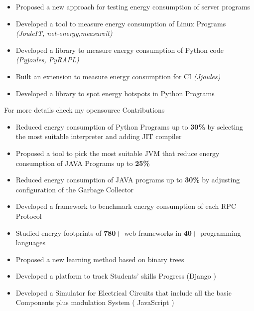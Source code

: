 \documentclass[10pt,a4paper,ragged2e,withhyper]{altacv}
\begin{document}
\begin{paracol}{2}
  \medskip

  \begin{itemize}
    \item Proposed a new approach for testing energy consumption of server programs
    \item Developed a tool to measure energy consumption of Linux Programs \emph{(JouleIT, net-energy,measureit)}
    \item Developed a library to measure energy consumption of Python code \emph{(Pyjoules, PyRAPL)}
    \item Built an extension to measure energy consumption for CI \emph{(Jjoules)}
    \item Developed a library to spot energy hotspots in Python Programs
  \end{itemize}
  For more details check my opensource Contributions
  \\
  \begin{itemize}
    \item Reduced energy consumption of Python Programs up to \textbf{30\%} by selecting the most suitable interpreter and adding JIT compiler
    \item Proposed a tool to pick the most suitable JVM that reduce energy consumption of JAVA Programs up to \textbf{25\%}
    \item Reduced energy consumption of JAVA programs up to \textbf{30\%} by adjusting configuration of the Garbage Collector
  \end{itemize}

  \begin{itemize}
    \item Developed a framework to benchmark energy consumption of each RPC Protocol
    \item Studied energy footprints of \textbf{780+} web frameworks in \textbf{40+} programming languages
  \end{itemize}

  \divider
  \begin{itemize}
    \item Proposed a new learning method based on binary trees
    \item Developed a platform to track Students' skills Progress (Django )
    \item Developed a Simulator for Electrical Circuits that include all the basic Components plus modulation System ( JavaScript )
  \end{itemize}
  \divider


\end{paracol}
\end{document}
